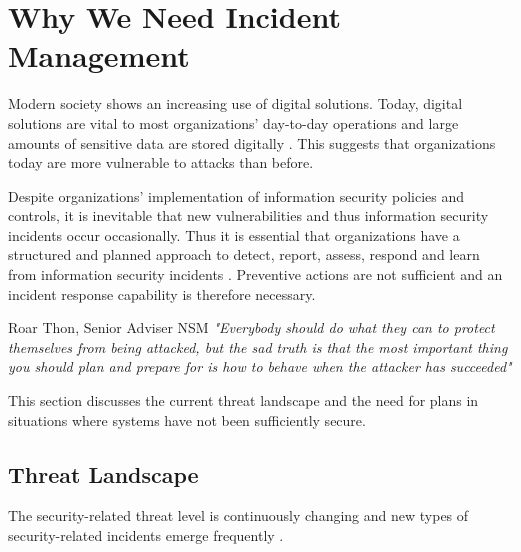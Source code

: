 \section{Why We Need Incident Management}
Modern society shows an increasing use of digital solutions. Today, digital solutions are vital to most organizations' day-to-day operations and large amounts of sensitive data are stored digitally \cite{KriposTrender}. This suggests that organizations today are more vulnerable to attacks than before. 

Despite organizations' implementation of information security policies and controls, it is inevitable that new vulnerabilities and thus information security incidents occur occasionally. Thus it is essential that organizations have a structured and planned approach to detect, report, assess, respond and learn from information security incidents \cite{ISO/IEC27035}. Preventive actions are not sufficient and an incident response capability is therefore necessary.

\begin{newquote}{Roar Thon, Senior Adviser \acs{NSM}}
\textit{"Everybody should do what they can to protect themselves from being attacked, but the sad truth is that the most important thing you should plan and prepare for is how to behave when the attacker has succeeded"}
\end{newquote}

This section discusses the current threat landscape and the need for plans in situations where systems have not been sufficiently secure. 

\subsection{Threat Landscape}
The security-related threat level is continuously changing and new types of security-related incidents emerge frequently \cite{nist800-61}. %

